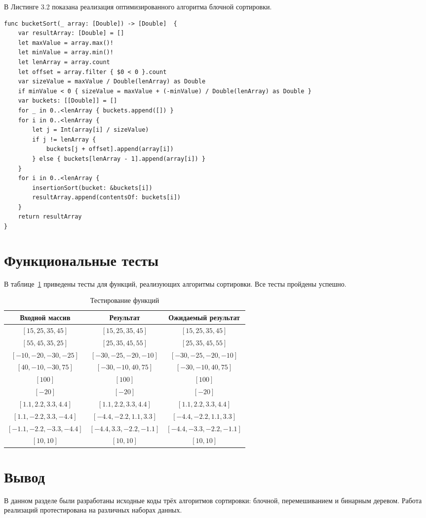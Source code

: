 В Листинге 3.2 показана реализация оптимизированного алгоритма блочной сортировки.
\begin{lstlisting}[caption=Функция алгоритма блочной сортировки]
func bucketSort(_ array: [Double]) -> [Double]  {
    var resultArray: [Double] = []
    let maxValue = array.max()!
    let minValue = array.min()!
    let lenArray = array.count
    let offset = array.filter { $0 < 0 }.count
    var sizeValue = maxValue / Double(lenArray) as Double
    if minValue < 0 { sizeValue = maxValue + (-minValue) / Double(lenArray) as Double }
    var buckets: [[Double]] = []
    for _ in 0..<lenArray { buckets.append([]) }
    for i in 0..<lenArray {
        let j = Int(array[i] / sizeValue)
        if j != lenArray {
            buckets[j + offset].append(array[i])
        } else { buckets[lenArray - 1].append(array[i]) }
    }
    for i in 0..<lenArray {
        insertionSort(bucket: &buckets[i])
        resultArray.append(contentsOf: buckets[i])
    }
    return resultArray
}
\end{lstlisting}

\section{Функциональные тесты}

В таблице~\ref{tbl:test} приведены тесты для функций, реализующих алгоритмы сортировки. Все тесты пройдены успешно.

\begin{table}[h!]
	\begin{center}
		\begin{tabular}{|c|c|c|}
			\hline
			Входной массив & Результат & Ожидаемый результат \\ 
			\hline
			$[15, 25, 35, 45]$ & $[15, 25, 35, 45]$  & $[15, 25, 35, 45]$\\\hline
			$[55, 45, 35, 25]$  & $[25, 35, 45, 55]$ & $[25, 35, 45, 55]$\\\hline
			$[-10, -20, -30, -25]$  & $[-30, -25, -20, -10]$  & $[-30, -25, -20, -10]$\\\hline
			$[40, -10, -30, 75]$  & $[-30, -10, 40, 75]$  & $[-30, -10, 40, 75]$\\\hline
			$[100]$  & $[100]$  & $[100]$\\\hline
			$[-20]$  & $[-20]$  & $[-20]$\\\hline
			$[1.1, 2.2, 3.3, 4.4]$  & $[1.1, 2.2, 3.3, 4.4]$  & $[1.1, 2.2, 3.3, 4.4]$\\\hline
			$[1.1, -2.2, 3.3, -4.4]$  & $[-4.4, -2.2, 1.1, 3.3]$  &  $[-4.4, -2.2, 1.1, 3.3]$\\\hline
			$[-1.1, -2.2, -3.3, -4.4]$  & $[-4.4, 3.3, -2.2, -1.1]$  &  $[-4.4, -3.3, -2.2, -1.1]$\\\hline
			$[10, 10]$  & $[10, 10]$  & $[10, 10]$ \\\hline
		\end{tabular}
		\caption{\label{tbl:test}Тестирование функций}
	\end{center}
\end{table}

\section{Вывод}

В данном разделе были разработаны исходные коды трёх алгоритмов сортировки: блочной, перемешиванием и бинарным деревом. Работа реализаций протестирована на различных наборах данных.
